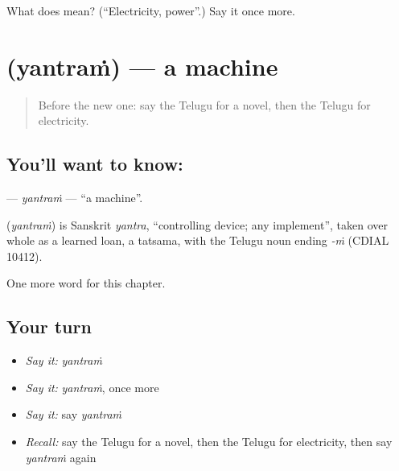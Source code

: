 \begin{tcolorbox}[breakable,colback=teal!4,colframe=teal!35!black,title={Before you move on}]
What does  mean? (\textquotedblleft{}Electricity, power\textquotedblright{}.) Say it once more.
\end{tcolorbox}
\section[\texorpdfstring{\te{యంత్రం} (yantraṁ)}{యంత్రం (yantraṁ)}]{ (yantraṁ) — a machine}

\label{lesson:TE-C190-yantram}



\begin{quote}
Before the new one: say the Telugu for a novel, then the Telugu for electricity.
\end{quote}

\subsection*{You'll want to know: }
\textbf{} — \emph{yantraṁ} — \textquotedblleft{}a machine\textquotedblright{}.

\begin{cousinweb}
\textbf{} (\emph{yantraṁ}) is Sanskrit \emph{yantra}, \textquotedblleft{}controlling device; any implement\textquotedblright{}, taken over whole as a learned loan, a tatsama, with the Telugu noun ending \emph{-ṁ} (CDIAL 10412).
\end{cousinweb}

\begin{grammarlens}[title={What you've built}]
One more word for this chapter.
\end{grammarlens}

\subsection*{Your turn}
\begin{itemize}
\raggedright
  \item \emph{Say it:} \emph{yantraṁ}
  \item \emph{Say it:} \emph{yantraṁ}, once more
  \item \emph{Say it:} say \emph{yantraṁ}
  \item \emph{Recall:} say the Telugu for a novel, then the Telugu for electricity, then say \emph{yantraṁ} again
\end{itemize}


